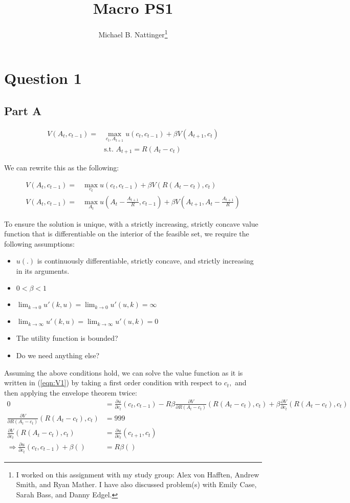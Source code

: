 \documentclass[11pt]{article} %
\title{Macro PS1}
\author{Michael B. Nattinger\footnote{I worked on this assignment with my study group: Alex von Hafften, Andrew Smith, and Ryan Mather. I have also discussed problem(s) with Emily Case, Sarah Bass, and Danny Edgel.}}
\begin{document}
\maketitle
\section{Question 1}
\subsection{Part A}
\begin{align*}
V(A_t,c_{t-1}) = &\max_{c_t,A_{t+1}} u(c_t,c_{t-1}) + \beta V(A_{t+1},c_t)\\
&\text{s.t. } A_{t+1} = R(A_t - c_t)
\end{align*}

We can rewrite this as the following:

\begin{align}
V(A_t,c_{t-1}) = &\max_{c_t} u(c_t,c_{t-1}) + \beta V(R(A_t - c_t),c_t) \label{eqn:V1}\\
V(A_t,c_{t-1}) = &\max_{A_t} u\left(A_t - \frac{A_{t+1}}{R},c_{t-1}\right) + \beta V\left(A_{t+1},A_t - \frac{A_{t+1}}{R}\right) \label{eqn:V2}
\end{align}

To ensure the solution is unique, with a strictly increasing, strictly concave value function that is differentiable on the interior of the feasible set, we require the following assumptions:
\begin{itemize}
\item $u(.)$ is continuously differentiable, strictly concave, and strictly increasing in its arguments.
\item $0<\beta <1$
\item $\lim_{k\rightarrow 0} u'(k,u) = \lim_{k\rightarrow 0} u'(u,k) = \infty$
\item $\lim_{k\rightarrow \infty} u'(k,u) = \lim_{k\rightarrow \infty} u'(u,k) = 0$
\item The utility function is bounded?
\item Do we need anything else?
\end{itemize}

Assuming the above conditions hold, we can solve the value function as it is written in (\ref{eqn:V1}) by taking a first order condition with respect to $c_t,$ and then applying the envelope theorem twice:
\begin{align*}
0 &=\frac{\partial u}{\partial c_t}(c_t,c_{t-1}) - R\beta \frac{\partial V}{\partial R(A_t - c_t)}(R(A_t - c_t),c_t) + \beta \frac{\partial V}{\partial c_t}(R(A_t - c_t),c_t)\\
\frac{\partial V}{\partial R(A_t - c_t)}(R(A_t - c_t),c_t) &= 999\\
\frac{\partial V}{\partial c_t}(R(A_t - c_t),c_t) &= \frac{\partial u}{\partial c_t}(c_{t+1},c_{t}) \\
\Rightarrow \frac{\partial u}{\partial c_t}(c_t,c_{t-1}) + \beta () &= R\beta ()
\end{align*}
\end{document}
